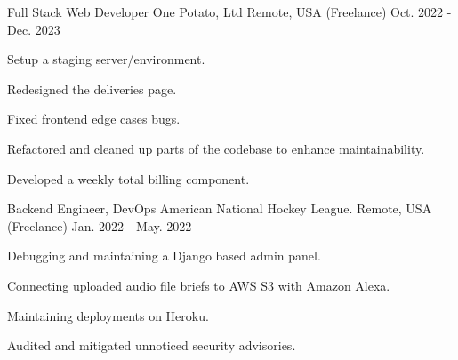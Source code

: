 \begin{cventries}
  \cventry
    {Full Stack Web Developer} %
    {One Potato, Ltd} %
    {Remote, USA (Freelance)} %
    {Oct. 2022 - Dec. 2023} %
    {
      \begin{cvitems} %
        \item {Setup a staging server/environment.}
        \item {Redesigned the deliveries page.}
        \item {Fixed frontend edge cases bugs.}
        \item {Refactored and cleaned up parts of the codebase to enhance maintainability.}
        \item {Developed a weekly total billing component.}
      \end{cvitems}
    }

  \cventry
    {Backend Engineer, DevOps} %
    {American National Hockey League.} %
    {Remote, USA (Freelance)} %
    {Jan. 2022 - May. 2022} %
    {
      \begin{cvitems} %
        \item {Debugging and maintaining a Django based admin panel.}
        \item {Connecting uploaded audio file briefs to AWS S3 with Amazon Alexa.}
        \item {Maintaining deployments on Heroku.}
        \item {Audited and mitigated unnoticed security advisories.}
      \end{cvitems}
    }


\end{cventries}
